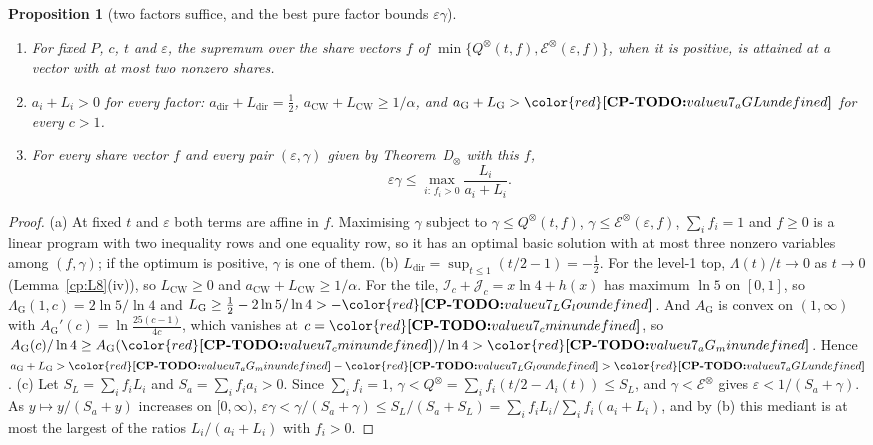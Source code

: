\documentclass[11pt]{article}
\makeatletter
\newtheorem{proposition}[theorem]{Proposition}
\theoremstyle{definition}
\theoremstyle{remark}
\DeclareRobustCommand{\CPTODO}[1]{{\color{red}\textbf{[CP-TODO:} #1\textbf{]}}}
\providecommand{\eps}{\varepsilon}
\newcommand{\Hb}{h}                           %
\newcommand{\Lam}{\Lambda}                    %
\newcommand{\ThmDprod}{Theorem~D\texorpdfstring{\ensuremath{_\otimes}}{\_x}}     %
\newcommand{\Qgain}[2]{Q^{#1}_{#2}}           %
\newcommand{\LamG}{\Lambda_{\mathrm G}}              %
\newcommand{\AG}{A_{\mathrm G}}                      %
\newcommand{\Ic}{\mathcal I}                         %
\newcommand{\Jc}{\mathcal J}                         %
\newcommand{\Eenc}[1]{\mathcal E^{#1}}               %
\newcommand{\cpv}[1]{\ifcsname cpv@#1\endcsname\csname cpv@#1\endcsname\else\CPTODO{value #1 undefined}\fi}
\makeatother
\begin{document}
\begin{proposition}[two factors suffice, and the best pure factor bounds $\eps\gamma$]\label{cp:G9}
\begin{enumerate}[label=(\alph*)]
\item For fixed $P$, $c$, $t$ and $\eps$, the supremum over the share vectors $f$ of $\min\{\Qgain{\otimes}{}(t,f),\Eenc{\otimes}(\eps,f)\}$, when it is positive, is attained at a vector with at most two nonzero shares.
\item $a_i+L_i>0$ for every factor: $a_{\mathrm{dir}}+L_{\mathrm{dir}}=\frac12$, $a_{\mathrm{CW}}+L_{\mathrm{CW}}\ge1/\alpha$, and $a_{\mathrm G}+L_{\mathrm G}>\cpv{u7_aGL}$ for every $c>1$.
\item For every share vector $f$ and every pair $(\eps,\gamma)$ given by \ThmDprod{} with this $f$,
\[
\eps\gamma\le\max_{i:\,f_i>0}\frac{L_i}{a_i+L_i}.
\]
\end{enumerate}
\end{proposition}

\begin{proof}
(a) At fixed $t$ and $\eps$ both terms are affine in $f$. Maximising $\gamma$ subject to $\gamma\le\Qgain{\otimes}{}(t,f)$, $\gamma\le\Eenc{\otimes}(\eps,f)$, $\sum_if_i=1$ and $f\ge0$ is a linear program with two inequality rows and one equality row, so it has an optimal basic solution with at most three nonzero variables among $(f,\gamma)$; if the optimum is positive, $\gamma$ is one of them.
(b) $L_{\mathrm{dir}}=\sup_{t\le1}(t/2-1)=-\frac12$. For the level-1 top, $\Lam(t)/t\to0$ as $t\to0$ (Lemma~\ref{cp:L8}(iv)), so $L_{\mathrm{CW}}\ge0$ and $a_{\mathrm{CW}}+L_{\mathrm{CW}}\ge1/\alpha$. For the tile, $\Ic_c+\Jc_c=x\ln4+\Hb(x)$ has maximum $\ln5$ on $[0,1]$, so $\LamG(1,c)=2\ln5/\ln4$ and $L_{\mathrm G}\ge\frac12-2\ln5/\ln4>-\cpv{u7_LG_lo}$. And $\AG$ is convex on $(1,\infty)$ with $\AG'(c)=\ln\frac{25(c-1)}{4c}$, which vanishes at $c=\cpv{u7_cmin}$, so $\AG(c)/\ln4\ge\AG(\cpv{u7_cmin})/\ln4>\cpv{u7_aG_min}$. Hence $a_{\mathrm G}+L_{\mathrm G}>\cpv{u7_aG_min}-\cpv{u7_LG_lo}>\cpv{u7_aGL}$.
(c) Let $S_L=\sum_if_iL_i$ and $S_a=\sum_if_ia_i>0$. Since $\sum_if_i=1$, $\gamma<\Qgain{\otimes}{}=\sum_if_i(t/2-\Lambda_i(t))\le S_L$, and $\gamma<\Eenc{\otimes}$ gives $\eps<1/(S_a+\gamma)$. As $y\mapsto y/(S_a+y)$ increases on $[0,\infty)$, $\eps\gamma<\gamma/(S_a+\gamma)\le S_L/(S_a+S_L)=\sum_if_iL_i\big/\sum_if_i(a_i+L_i)$, and by (b) this mediant is at most the largest of the ratios $L_i/(a_i+L_i)$ with $f_i>0$.
\end{proof}
\end{document}
